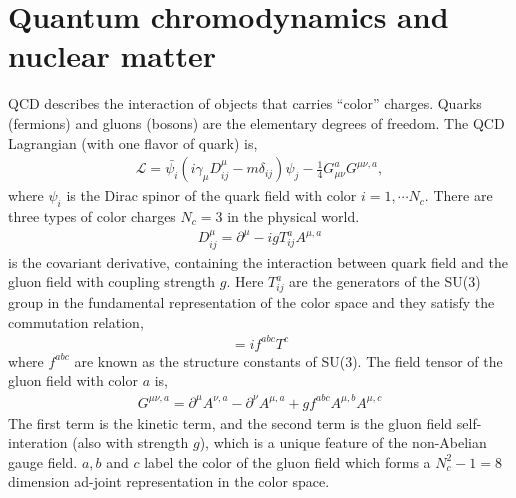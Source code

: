 \section{Quantum chromodynamics and nuclear matter}
QCD describes the interaction of objects that carries ``color'' charges.
Quarks (fermions) and gluons (bosons) are the elementary degrees of freedom. 
The QCD Lagrangian (with one flavor of quark) is,
\begin{eqnarray}
\mathcal{L} = \bar{\psi_i} \left(i\gamma_\mu D^\mu_{ij} -m \delta_{ij} \right)\psi_j - \frac{1}{4}G_{\mu\nu}^a G^{\mu\nu,a},
\end{eqnarray}
where $\psi_i$ is the Dirac spinor of the quark field with color $i=1,\cdots N_c$. 
There are three types of color charges $N_c = 3$ in the physical world.
\begin{eqnarray}
D_{ij}^\mu = \partial^\mu - i g T_{ij}^a A^{\mu, a}
\end{eqnarray}
is the covariant derivative, containing the interaction between quark field and the gluon field with coupling strength $g$.
Here $T_{ij}^a$ are the generators of the SU(3) group in the fundamental representation of the color space and they satisfy the commutation relation,
\begin{eqnarray}
[T^a, T^b] = i f^{abc} T^c
\end{eqnarray}
where $f^{abc}$ are known as the structure constants of SU(3).
The field tensor of the gluon field with color $a$ is,
\begin{eqnarray}
G^{\mu\nu,a} = \partial^\mu A^{\nu, a} - \partial^\nu A^{\mu, a} + g f^{abc} A^{\mu,b}A^{\mu,c}
\end{eqnarray}
The first term is the kinetic term, and the second term is the gluon field self-interation (also with strength $g$), which is a unique feature of the non-Abelian gauge field.
$a, b$ and $c$ label the color of the gluon field which forms a $N_c^2-1=8$ dimension ad-joint representation in the color space.

